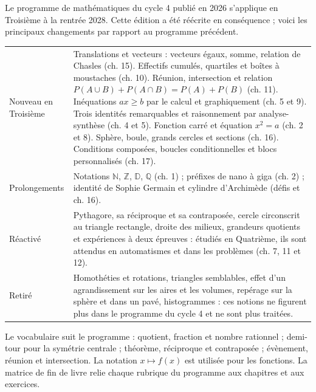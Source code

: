 \clearpage\thispagestyle{otFront}\label{nouveautes}\fontsize{11}{15}\selectfont

Le programme de mathématiques du cycle 4 publié en 2026 s’applique en Troisième
à la rentrée 2028. Cette édition a été réécrite en conséquence ; voici les
principaux changements par rapport au programme précédent.\par\medskip
\fontsize{10}{13.5}\selectfont
\begin{tabularx}{\linewidth}{@{}>{\raggedright\arraybackslash}p{27mm}Y@{}}\toprule
Nouveau en Troisième & Translations et vecteurs : vecteurs égaux, somme, relation de Chasles (ch. 15). Effectifs cumulés, quartiles et boîtes à moustaches (ch. 10). Réunion, intersection et relation $P(A\cup B)+P(A\cap B)=P(A)+P(B)$ (ch. 11). Inéquations $ax\ge b$ par le calcul et graphiquement (ch. 5 et 9). Trois identités remarquables et raisonnement par analyse-synthèse (ch. 4 et 5). Fonction carré et équation $x^2=a$ (ch. 2 et 8). Sphère, boule, grands cercles et sections (ch. 16). Conditions composées, boucles conditionnelles et blocs personnalisés (ch. 17).\\[3mm]
Prolongements & Notations $\mathbb N$, $\mathbb Z$, $\mathbb D$, $\mathbb Q$ (ch. 1) ; préfixes de nano à giga (ch. 2) ; identité de Sophie Germain et cylindre d’Archimède (défis et ch. 16).\\[3mm]
Réactivé & Pythagore, sa réciproque et sa contraposée, cercle circonscrit au triangle rectangle, droite des milieux, grandeurs quotients et expériences à deux épreuves : étudiés en Quatrième, ils sont attendus en automatismes et dans les problèmes (ch. 7, 11 et 12).\\[3mm]
Retiré & Homothéties et rotations, triangles semblables, effet d’un agrandissement sur les aires et les volumes, repérage sur la sphère et dans un pavé, histogrammes : ces notions ne figurent plus dans le programme du cycle 4 et ne sont plus traitées.\\\bottomrule
\end{tabularx}
\par\medskip\fontsize{11}{15}\selectfont
Le vocabulaire suit le programme : quotient, fraction et nombre rationnel ;
demi-tour pour la symétrie centrale ; théorème, réciproque et contraposée ;
évènement, réunion et intersection. La notation $x\mapsto f(x)$ est utilisée
pour les fonctions. La matrice de fin de livre relie chaque rubrique du
programme aux chapitres et aux exercices.

\clearpage
